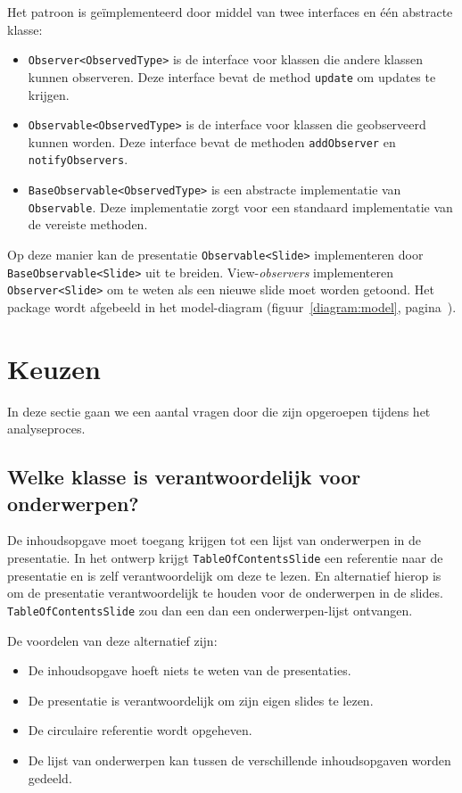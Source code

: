\documentclass[a4paper]{article}
\newcommand{\question}[1]{
  \subsection{#1}
}
\newcommand{\code}[1]{\lstinline[columns=fixed]{#1}}
\begin{document}
		Het patroon is geïmplementeerd door middel van twee interfaces en één abstracte klasse:
		\begin{itemize}
			\item \code{Observer<ObservedType>} is de interface voor klassen die andere klassen kunnen observeren.
				Deze interface bevat de method \code{update} om updates te krijgen.
			\item \code{Observable<ObservedType>} is de interface voor klassen die geobserveerd kunnen worden.
				Deze interface bevat de methoden \code{addObserver} en \code{notify}\-\code{Observers}.
			\item \code{BaseObservable<ObservedType>} is een abstracte implementatie van \code{Ob}\-\code{servable}.
				Deze implementatie zorgt voor een standaard implementatie van de vereiste methoden.
		\end{itemize}

		Op deze manier kan de presentatie \code{Observable<Slide>} implementeren door \code{BaseObservable<Slide>} uit te breiden.
		View-\textit{observers} implementeren \code{Obser}\-\code{ver<Slide>} om te weten als een nieuwe slide moet worden getoond.
		Het package wordt afgebeeld in het model-diagram (figuur~\ref{diagram:model}, pagina~\pageref{diagram:model}).

\pagebreak
\section{Keuzen}\label{sec:keuzen}
    In deze sectie gaan we een aantal vragen door die zijn opgeroepen tijdens het analyseproces.
   
    \question{Welke klasse is verantwoordelijk voor onderwerpen?}
		De inhoudsopgave moet toegang krijgen tot een lijst van onderwerpen in de presentatie.
		In het ontwerp krijgt \code{TableOfContentsSlide} een referentie naar de presentatie en is zelf verantwoordelijk om deze te lezen.
		En alternatief hierop is om de presentatie verantwoordelijk te houden voor de onderwerpen in de slides.
		\code{TableOfContentsSlide} zou dan een dan een onderwerpen-lijst ontvangen.

		De voordelen van deze alternatief zijn:
		\begin{itemize}
			\item De inhoudsopgave hoeft niets te weten van de presentaties.
			\item De presentatie is verantwoordelijk om zijn eigen slides te lezen.
			\item De circulaire referentie wordt opgeheven.
			\item De lijst van onderwerpen kan tussen de verschillende inhoudsopgaven worden gedeeld.
		\end{itemize}
\end{document}
